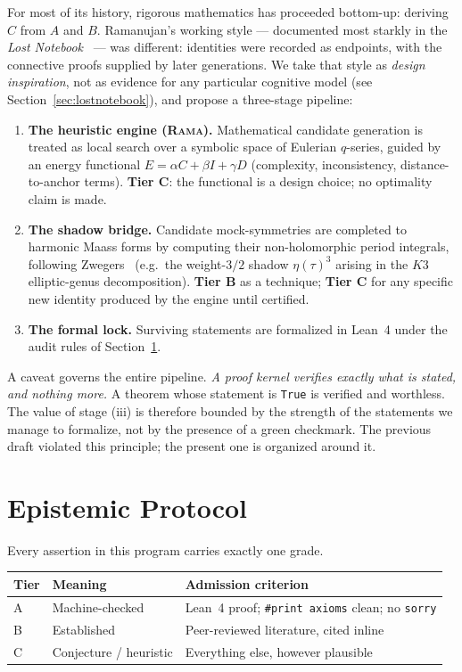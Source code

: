 \documentclass[11pt,a4paper]{article}
\theoremstyle{plain}
\theoremstyle{definition}
\theoremstyle{remark}
\newcommand{\tierB}{\textbf{Tier B}}
\newcommand{\tierC}{\textbf{Tier C}}
\begin{document}
For most of its history, rigorous mathematics has proceeded bottom-up:
deriving $C$ from $A$ and $B$. Ramanujan's working style --- documented most
starkly in the \emph{Lost Notebook}~\cite{Narosa1988,AndrewsBerndt} --- was
different: identities were recorded as endpoints, with the connective proofs
supplied by later generations. We take that style as \emph{design
inspiration}, not as evidence for any particular cognitive model (see
Section~\ref{sec:lostnotebook}), and propose a three-stage pipeline:

\begin{enumerate}
\item \textbf{The heuristic engine (\textsc{Rama}).} Mathematical candidate
generation is treated as local search over a symbolic space of Eulerian
$q$-series, guided by an energy functional
$E=\alpha C+\beta I+\gamma D$ (complexity, inconsistency, distance-to-anchor
terms). \tierC{}: the functional is a design choice; no optimality claim is
made.
\item \textbf{The shadow bridge.} Candidate mock-symmetries are completed to
harmonic Maass forms by computing their non-holomorphic period integrals,
following Zwegers~\cite{Zwegers2002} (e.g.\ the weight-$3/2$ shadow
$\eta(\tau)^{3}$ arising in the $K3$ elliptic-genus decomposition). \tierB{}
as a technique; \tierC{} for any specific new identity produced by the
engine until certified.
\item \textbf{The formal lock.} Surviving statements are formalized in
Lean~4 under the audit rules of Section~\ref{sec:protocol}.
\end{enumerate}

A caveat governs the entire pipeline. \emph{A proof kernel verifies exactly
what is stated, and nothing more.} A theorem whose statement is \texttt{True}
is verified and worthless. The value of stage (iii) is therefore bounded by
the strength of the statements we manage to formalize, not by the presence
of a green checkmark. The previous draft violated this principle; the
present one is organized around it.

\section{Epistemic Protocol}\label{sec:protocol}

Every assertion in this program carries exactly one grade.

\begin{center}
\begin{tabular}{@{}lll@{}}
\toprule
Tier & Meaning & Admission criterion \\
\midrule
A & Machine-checked & Lean~4 proof; \texttt{\#print axioms} clean; no \texttt{sorry} \\
B & Established & Peer-reviewed literature, cited inline \\
C & Conjecture / heuristic & Everything else, however plausible \\
\bottomrule
\end{tabular}
\end{center}
\end{document}
